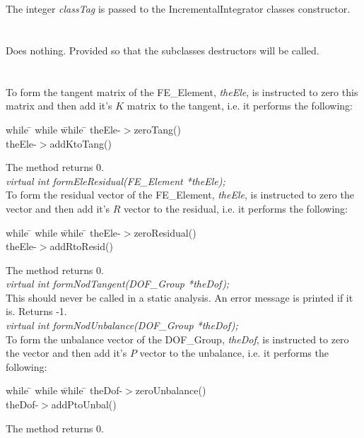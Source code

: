  \\
\\ 
The integer {\em classTag} is passed to the
IncrementalIntegrator classes constructor. \\

 \\
\\ 
Does nothing. Provided so that the subclasses destructors will be called.\\

\\
 \\
To form the tangent matrix of the FE\_Element, {\em theEle}, is
instructed to zero this matrix and then add it's $K$ matrix to the
tangent, i.e. it performs the following: 
\begin{tabbing}
while \= \+ while \= while \= \kill
theEle-$>$zeroTang() \\
theEle-$>$addKtoTang() 
\end{tabbing}
\noindent The method returns $0$. \\

{\em virtual int formEleResidual(FE\_Element *theEle);} \\
To form the residual vector of the FE\_Element, {\em theEle}, is
instructed to zero the vector and then add it's $R$ vector to
the residual, i.e. it performs the following: 
\begin{tabbing}
while \= \+ while \= while \= \kill
theEle-$>$zeroResidual() \\
theEle-$>$addRtoResid() 
\end{tabbing}
\noindent The method returns $0$. \\

{\em virtual int formNodTangent(DOF\_Group *theDof);} \\
This should never be called in a static analysis. An error message is
printed if it is. Returns -1. \\


{\em virtual int formNodUnbalance(DOF\_Group *theDof);} \\
To form the unbalance vector of the DOF\_Group, {\em theDof}, is
instructed to zero the vector and then add it's $P$ vector to the
unbalance, i.e. it performs the following: 
\begin{tabbing}
while \= \+ while \= while \= \kill
theDof-$>$zeroUnbalance() \\
theDof-$>$addPtoUnbal() 
\end{tabbing}
\noindent The method returns $0$. \\


